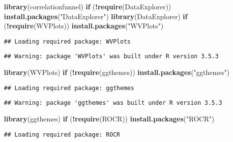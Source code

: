 \documentclass[]{article}
\newenvironment{Shaded}{\begin{snugshade}}{\end{snugshade}}
\newcommand{\KeywordTok}[1]{\textcolor[rgb]{0.13,0.29,0.53}{\textbf{#1}}}
\newcommand{\StringTok}[1]{\textcolor[rgb]{0.31,0.60,0.02}{#1}}
\newcommand{\ControlFlowTok}[1]{\textcolor[rgb]{0.13,0.29,0.53}{\textbf{#1}}}
\newcommand{\OperatorTok}[1]{\textcolor[rgb]{0.81,0.36,0.00}{\textbf{#1}}}
\newcommand{\NormalTok}[1]{#1}
\begin{document}
\begin{Shaded}
\begin{Highlighting}[]
\KeywordTok{library}\NormalTok{(correlationfunnel)}
\ControlFlowTok{if}\NormalTok{ (}\OperatorTok{!}\KeywordTok{require}\NormalTok{(DataExplorer)) }\KeywordTok{install.packages}\NormalTok{(}\StringTok{"DataExplorer"}\NormalTok{)}
\KeywordTok{library}\NormalTok{(DataExplorer)}
\ControlFlowTok{if}\NormalTok{ (}\OperatorTok{!}\KeywordTok{require}\NormalTok{(WVPlots)) }\KeywordTok{install.packages}\NormalTok{(}\StringTok{"WVPlots"}\NormalTok{)}
\end{Highlighting}
\end{Shaded}

\begin{verbatim}
## Loading required package: WVPlots
\end{verbatim}

\begin{verbatim}
## Warning: package 'WVPlots' was built under R version 3.5.3
\end{verbatim}

\begin{Shaded}
\begin{Highlighting}[]
\KeywordTok{library}\NormalTok{(WVPlots)}
\ControlFlowTok{if}\NormalTok{ (}\OperatorTok{!}\KeywordTok{require}\NormalTok{(ggthemes)) }\KeywordTok{install.packages}\NormalTok{(}\StringTok{"ggthemes"}\NormalTok{)}
\end{Highlighting}
\end{Shaded}

\begin{verbatim}
## Loading required package: ggthemes
\end{verbatim}

\begin{verbatim}
## Warning: package 'ggthemes' was built under R version 3.5.3
\end{verbatim}

\begin{Shaded}
\begin{Highlighting}[]
\KeywordTok{library}\NormalTok{(ggthemes) }
\ControlFlowTok{if}\NormalTok{ (}\OperatorTok{!}\KeywordTok{require}\NormalTok{(ROCR)) }\KeywordTok{install.packages}\NormalTok{(}\StringTok{"ROCR"}\NormalTok{)}
\end{Highlighting}
\end{Shaded}

\begin{verbatim}
## Loading required package: ROCR
\end{verbatim}
\end{document}
